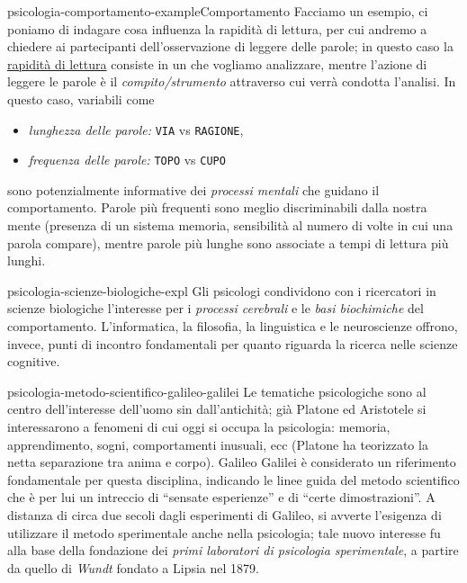 \documentclass[preview]{standalone}
\begin{document}
\begin{snippetexample}{psicologia-comportamento-example}{Comportamento}
    Facciamo un esempio, ci poniamo di indagare cosa influenza la rapidità di lettura, per cui andremo
    a chiedere ai partecipanti dell'osservazione di leggere delle parole; in questo caso la
    \underline{rapidità di lettura} consiste in un 
    che vogliamo analizzare, mentre l'azione di leggere le parole
    è il \emph{compito/strumento} attraverso cui verrà condotta l'analisi.
    In questo caso, variabili come
    \begin{itemize}
        \item \emph{lunghezza delle parole:} \texttt{VIA} vs \texttt{RAGIONE},
        \item \emph{frequenza delle parole:} \texttt{TOPO} vs \texttt{CUPO}
    \end{itemize}
    sono potenzialmente informative dei \emph{processi mentali} che guidano il comportamento.
    Parole più frequenti sono meglio discriminabili dalla nostra mente (presenza di un sistema memoria,
    sensibilità al numero di volte in cui una parola compare), mentre parole più lunghe sono associate a
    tempi di lettura più lunghi.
\end{snippetexample}

\begin{snippet}{psicologia-scienze-biologiche-expl}
    Gli psicologi condividono con i ricercatori in scienze biologiche l'interesse per i \emph{processi cerebrali}
    e le \emph{basi biochimiche} del comportamento. L'informatica, la filosofia, la linguistica e le
    neuroscienze offrono, invece, punti di incontro fondamentali per quanto riguarda la ricerca nelle
    scienze cognitive.
\end{snippet}

\begin{snippet}{psicologia-metodo-scientifico-galileo-galilei}
    Le tematiche psicologiche sono al centro dell'interesse dell'uomo sin dall'antichità; già Platone ed
    Aristotele si interessarono a fenomeni di cui oggi si occupa la psicologia: memoria, apprendimento,
    sogni, comportamenti inusuali, ecc (Platone ha teorizzato la netta separazione tra anima e corpo).
    Galileo Galilei è considerato un riferimento
    fondamentale per questa disciplina, indicando le
    linee guida del metodo scientifico che è per lui un
    intreccio di ``sensate esperienze'' e di ``certe
    dimostrazioni''.
    A distanza di circa due secoli dagli esperimenti di Galileo, si avverte l'esigenza di utilizzare il
    metodo sperimentale anche nella psicologia; tale nuovo interesse fu alla base della fondazione dei
    \emph{primi laboratori di psicologia sperimentale}, a partire da quello di \emph{Wundt} fondato a Lipsia nel
    1879.
\end{snippet}
\end{document}
